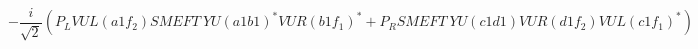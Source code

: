 %
\begin{dmath*}
%
  -  \frac{i}{\sqrt{2}} \left(P_L VUL\left(a1 f_2\right) SMEFT \  YU(a1 b1)^* VUR\left(b1 f_1\right)^* + P_R SMEFT \  YU(c1 d1) VUR\left(d1 f_2\right) VUL\left(c1 f_1\right)^*\right)
%
\end{dmath*}
%
